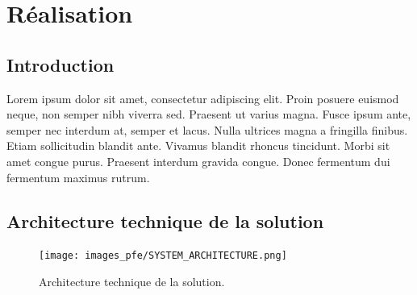 \chapter{Réalisation}

\newpage

\section{Introduction}
Lorem ipsum dolor sit amet, consectetur adipiscing elit. Proin posuere euismod neque, non semper nibh viverra sed. Praesent ut varius magna. Fusce ipsum ante, semper nec interdum at, semper et lacus. Nulla ultrices magna a fringilla finibus. Etiam sollicitudin blandit ante. Vivamus blandit rhoncus tincidunt. Morbi sit amet congue purus. Praesent interdum gravida congue. Donec fermentum dui fermentum maximus rutrum.

\section{Architecture technique de la solution}

\begin{figure}[hbt!]
  \centering
  \texttt{[image: images\_pfe/SYSTEM\_ARCHITECTURE.png]}
  \caption{Architecture technique de la solution.}
  \label{fig:technical-architecture}
\end{figure}
\FloatBarrier

